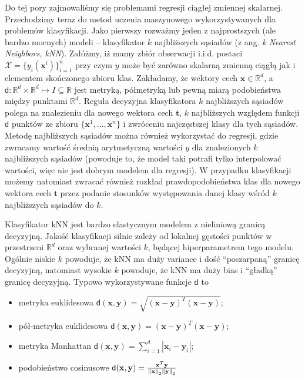\documentclass{myclass}
\numberwithin{equation}{section}
\begin{document}
Do tej pory zajmowaliśmy się problemami regresji ciągłej zmiennej skalarnej. Przechodzimy teraz do
metod uczenia maszynowego wykorzystywanych dla problemów klasyfikacji. Jako pierwszy rozważmy jeden
z najprostszych (ale bardzo mocnych) modeli -- klasyfikator \(k\) najbliższych sąsiadów (z ang.
\textit{k Nearest Neighbors, kNN}). Załóżmy, iż mamy zbiór obserwacji i.i.d. postaci \(\mathcal{X} =
\{y_i(\mathbf{x}^i)\}_{i=1}^n\) przy czym \(y\) może być zarówno skalarną zmienną ciągłą jak i
elementem skończonego zbioru klas. Zakładamy, że wektory cech \(\mathbf{x} \in \mathbb{R}^d\), a
\(\mathsf{d}: \mathbb{R}^d \times \mathbb{R}^d \mapsto I \subseteq \mathbb{R}\) jest metryką,
półmetryką lub pewną miarą podobieństwa między punktami \(\mathbb{R}^d\). Reguła decyzyjna
klasyfikatora \(k\) najbliższych sąsiadów polega na znalezieniu dla nowego wektora cech
\(\mathbf{t}\), \(k\) najbliższych względem funkcji \(\mathsf{d}\) punktów ze zbioru
\(\{\mathbf{x}^1,\ldots,\mathbf{x}^n\}\) i zwróceniu najczęstszej klasy dla tych sąsiadów. Metodę
najbliższych sąsiadów można również wykorzystać do regresji, gdzie zwracamy wartość średnią
arytmetyczną wartości \(y\) dla znalezionych \(k\) najbliższych sąsiadów (powoduje to, że model taki
potrafi tylko interpolować wartości, więc nie jest dobrym modelem dla regresji). W przypadku
klasyfikacji możemy natomiast zwracać również rozkład prawdopodobieństwa klas dla nowego wektora
cech \(\mathbf{t}\) przez podanie stosunków występowania danej klasy wśród \(k\) najbliższych
sąsiadów do \(k\).

Klasyfikator kNN jest bardzo elastycznym modelem z nieliniową granicą decyzyjną. Jakość klasyfikacji
silnie zależy od lokalnej gęstości punktów w przestrzeni \(\mathbb{R}^d\) oraz wybranej wartości
\(k\), będącej hiperparametrem tego modelu. Ogólnie niskie \(k\) powoduje, że kNN ma duży variance i
dość \enquote{poszarpaną} granicę decyzyjną, natomiast wysokie \(k\) powoduje, że kNN ma duży bias i
\enquote{gładką} granicę decyzyjną. Typowo wykorzystywane funkcje \(\mathsf{d}\) to
\begin{itemize}

    \item metryka euklidesowa \(\mathsf{d}(\mathbf{x},\mathbf{y}) = \sqrt{(\mathbf{x} -
    \mathbf{y})^T(\mathbf{x} - \mathbf{y})}\);

    \item pół-metryka euklidesowa \(\mathsf{d}(\mathbf{x},\mathbf{y}) = (\mathbf{x} -
    \mathbf{y})^T(\mathbf{x} - \mathbf{y})\);

    \item metryka Manhattan \(\mathsf{d}(\mathbf{x}, \mathbf{y}) = \sum_{i=1}^d |\mathbf{x}_i -
    \mathbf{y}_i|\);
    
    \item podobieństwo cosinusowe \(\mathsf{d}(\mathbf{x}, \mathbf{y}) =
    \frac{\mathbf{x}^T\mathbf{y}}{\norm{\mathbf{x}}_2 \norm{\mathbf{y}}_2}\)
    
\end{itemize}
\end{document}
